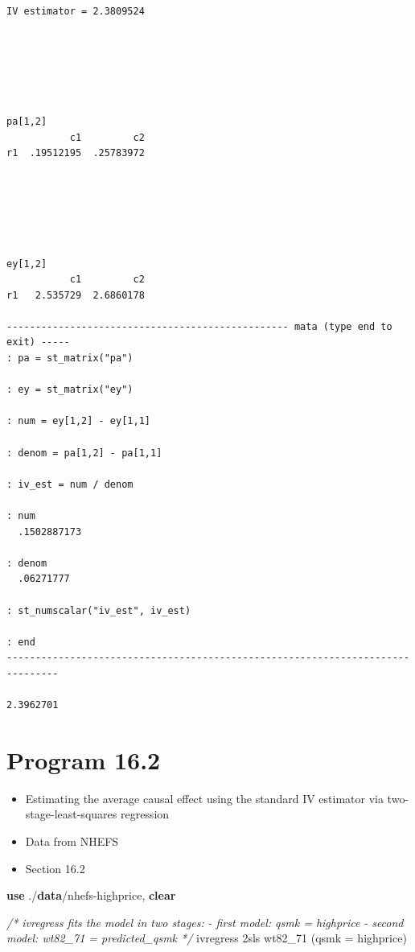 \documentclass[
  10pt,
]{book}
\newenvironment{Shaded}{\begin{snugshade}}{\end{snugshade}}
\newcommand{\CommentTok}[1]{\textcolor[rgb]{0.56,0.35,0.01}{\textit{#1}}}
\newcommand{\KeywordTok}[1]{\textcolor[rgb]{0.13,0.29,0.53}{\textbf{#1}}}
\newcommand{\NormalTok}[1]{#1}
\providecommand{\tightlist}{%
  \setlength{\itemsep}{0pt}\setlength{\parskip}{0pt}}
\begin{document}
\begin{verbatim}
IV estimator = 2.3809524






pa[1,2]
           c1         c2
r1  .19512195  .25783972






ey[1,2]
           c1         c2
r1   2.535729  2.6860178

------------------------------------------------- mata (type end to exit) -----
: pa = st_matrix("pa")

: ey = st_matrix("ey")

: num = ey[1,2] - ey[1,1] 

: denom = pa[1,2] - pa[1,1]

: iv_est = num / denom 

: num
  .1502887173

: denom
  .06271777

: st_numscalar("iv_est", iv_est)

: end
-------------------------------------------------------------------------------

2.3962701
\end{verbatim}

\hypertarget{program-16.2}{%
\section{Program 16.2}\label{program-16.2}}

\begin{itemize}
\tightlist
\item
  Estimating the average causal effect using the standard IV estimator via two-stage-least-squares regression
\item
  Data from NHEFS
\item
  Section 16.2
\end{itemize}

\begin{Shaded}
\begin{Highlighting}[]
\KeywordTok{use}\NormalTok{ ./}\KeywordTok{data}\NormalTok{/nhefs-highprice, }\KeywordTok{clear}

\CommentTok{/* ivregress fits the model in two stages:}
\CommentTok{- first model: qsmk = highprice}
\CommentTok{- second model: wt82_71 = predicted_qsmk */}
\NormalTok{ivregress 2sls wt82_71 (qsmk = highprice)}
\end{Highlighting}
\end{Shaded}
\end{document}

